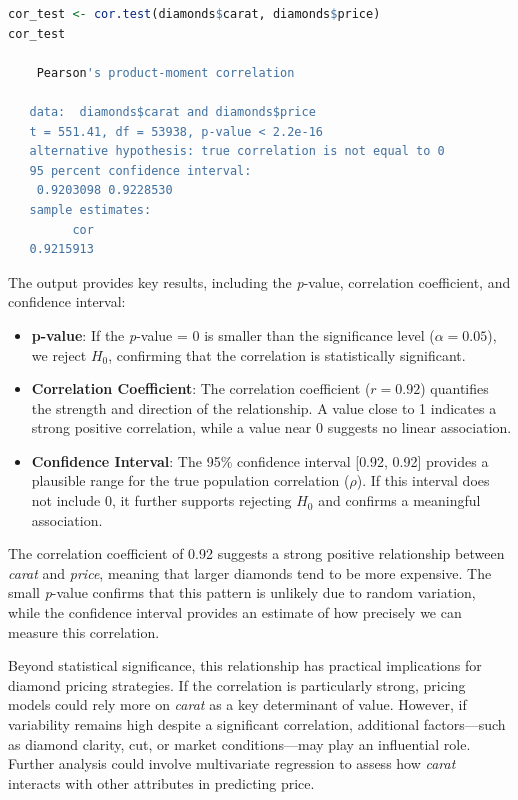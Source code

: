 \documentclass[
  11pt,
]{book}
\providecommand{\tightlist}{%
  \setlength{\itemsep}{0pt}\setlength{\parskip}{0pt}}
\theoremstyle{definition}
\theoremstyle{definition}
\theoremstyle{definition}
\theoremstyle{definition}
\theoremstyle{remark}
\begin{document}
\begin{lstlisting}[language=R]
cor_test <- cor.test(diamonds$carat, diamonds$price)
cor_test
   
    Pearson's product-moment correlation
   
   data:  diamonds$carat and diamonds$price
   t = 551.41, df = 53938, p-value < 2.2e-16
   alternative hypothesis: true correlation is not equal to 0
   95 percent confidence interval:
    0.9203098 0.9228530
   sample estimates:
         cor 
   0.9215913
\end{lstlisting}

The output provides key results, including the \emph{p}-value, correlation coefficient, and confidence interval:

\begin{itemize}
\tightlist
\item
  \textbf{p-value}: If the \emph{p}-value = 0 is smaller than the significance level (\(\alpha = 0.05\)), we reject \(H_0\), confirming that the correlation is statistically significant.
\item
  \textbf{Correlation Coefficient}: The correlation coefficient (\(r = 0.92\)) quantifies the strength and direction of the relationship. A value close to 1 indicates a strong positive correlation, while a value near 0 suggests no linear association.
\item
  \textbf{Confidence Interval}: The 95\% confidence interval {[}0.92, 0.92{]} provides a plausible range for the true population correlation (\(\rho\)). If this interval does not include 0, it further supports rejecting \(H_0\) and confirms a meaningful association.
\end{itemize}

The correlation coefficient of 0.92 suggests a strong positive relationship between \emph{carat} and \emph{price}, meaning that larger diamonds tend to be more expensive. The small \emph{p}-value confirms that this pattern is unlikely due to random variation, while the confidence interval provides an estimate of how precisely we can measure this correlation.

Beyond statistical significance, this relationship has practical implications for diamond pricing strategies. If the correlation is particularly strong, pricing models could rely more on \emph{carat} as a key determinant of value. However, if variability remains high despite a significant correlation, additional factors---such as diamond clarity, cut, or market conditions---may play an influential role. Further analysis could involve multivariate regression to assess how \emph{carat} interacts with other attributes in predicting price.
\end{document}
